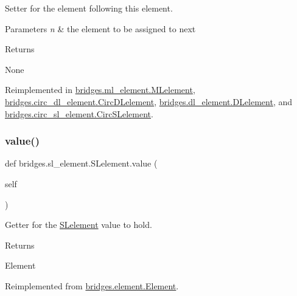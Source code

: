 Setter for the element following this element. 


\begin{DoxyParams}{Parameters}
{\em n} & the element to be assigned to next \\
\hline
\end{DoxyParams}
\begin{DoxyReturn}{Returns}


None 
\end{DoxyReturn}


Reimplemented in \mbox{\hyperlink{classbridges_1_1ml__element_1_1_m_lelement_a588b700bb42eb43ce3993f9715497deb}{bridges.\+ml\+\_\+element.\+M\+Lelement}}, \mbox{\hyperlink{classbridges_1_1circ__dl__element_1_1_circ_d_lelement_adb12e76948e7515f1987fc3bdbe0e861}{bridges.\+circ\+\_\+dl\+\_\+element.\+Circ\+D\+Lelement}}, \mbox{\hyperlink{classbridges_1_1dl__element_1_1_d_lelement_ae46f630cd7384689d4305770e6b2c7c1}{bridges.\+dl\+\_\+element.\+D\+Lelement}}, and \mbox{\hyperlink{classbridges_1_1circ__sl__element_1_1_circ_s_lelement_a19e7629abd5d54b9471c5167f0395ec6}{bridges.\+circ\+\_\+sl\+\_\+element.\+Circ\+S\+Lelement}}.

\mbox{\label{classbridges_1_1sl__element_1_1_s_lelement_a64ede02c56a4efaaa4c64a245bd01dd0}} 
\subsubsection{\texorpdfstring{value()}{value()}\hspace{0.1cm}{\footnotesize\ttfamily [1/2]}}
{\footnotesize\ttfamily def bridges.\+sl\+\_\+element.\+S\+Lelement.\+value (\begin{DoxyParamCaption}\item[{}]{self }\end{DoxyParamCaption})}



Getter for the \mbox{\hyperlink{classbridges_1_1sl__element_1_1_s_lelement}{S\+Lelement}} value to hold. 

\begin{DoxyReturn}{Returns}


Element 
\end{DoxyReturn}


Reimplemented from \mbox{\hyperlink{classbridges_1_1element_1_1_element_ad18e8738e025d7af322144aecbec1629}{bridges.\+element.\+Element}}.


